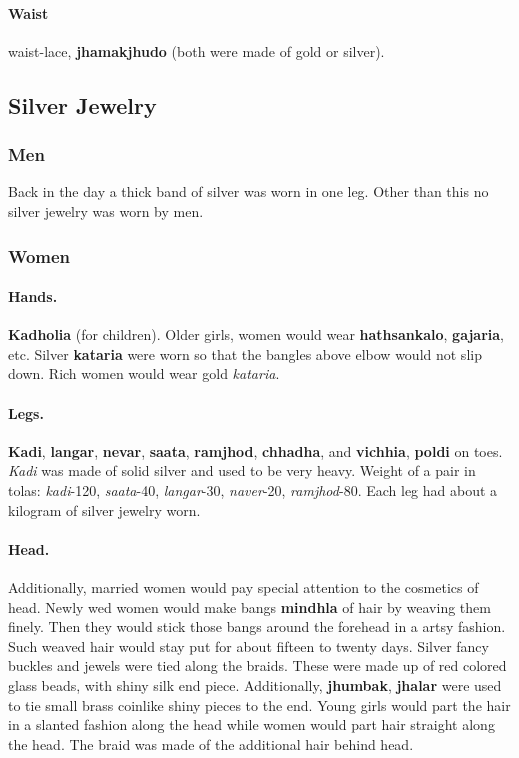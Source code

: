 \paragraph{Waist} waist-lace, \textbf{jhamakjhudo} (both were made of gold or silver).

\subsection{Silver Jewelry}
\subsubsection*{Men} Back in the day a thick band of silver was worn in one leg. Other than this no silver jewelry was worn by men.

\subsubsection*{Women}

\paragraph{Hands.} \textbf{Kadholia} (for children). Older girls, women would
wear \textbf{hathsankalo}, \textbf{gajaria}, etc. Silver \textbf{kataria} were
worn so that the bangles above elbow would not slip down. Rich women would wear
gold \textit{kataria}.

\paragraph{Legs.} \textbf{Kadi}, \textbf{langar}, \textbf{nevar},
\textbf{saata},  \textbf{ramjhod}, \textbf{chhadha},  and \textbf{vichhia},
\textbf{poldi} on toes. \textit{Kadi} was made of solid silver and used to
be very heavy. Weight of a pair in tolas: \textit{kadi}-120,
\textit{saata}-40, \textit{langar}-30, \textit{naver}-20,
\textit{ramjhod}-80. Each leg had about a kilogram of silver jewelry worn. 

\paragraph{Head.} Additionally, married women would pay special attention to
the cosmetics of head. Newly wed women would make bangs \textbf{mindhla} of
hair by weaving them finely. Then they would stick those bangs around the
forehead in a artsy fashion. Such weaved hair would stay put for about fifteen
to twenty days. Silver fancy buckles and jewels were tied along the braids.
These were made up of red colored glass beads, with shiny silk end piece.
Additionally, \textbf{jhumbak}, \textbf{jhalar} were used to tie small brass
coinlike shiny pieces to the end. Young girls would part the hair in a slanted
fashion along the head while women would part hair straight along the head. The
braid was made of the additional hair behind head.

